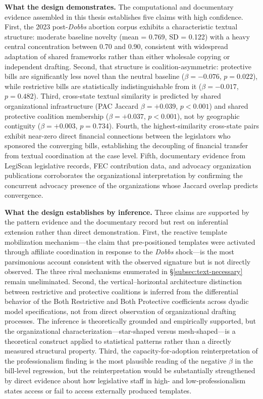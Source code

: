 \textbf{What the design demonstrates.} The computational and documentary evidence assembled in this thesis establishes five claims with high confidence. First, the 2023 post-\emph{Dobbs} abortion corpus exhibits a characteristic textual structure: moderate baseline novelty (mean = 0.769, SD = 0.122) with a heavy central concentration between 0.70 and 0.90, consistent with widespread adaptation of shared frameworks rather than either wholesale copying or independent drafting. Second, that structure is coalition-asymmetric: protective bills are significantly less novel than the neutral baseline ($\beta = -0.076$, $p = 0.022$), while restrictive bills are statistically indistinguishable from it ($\beta = -0.017$, $p = 0.482$). Third, cross-state textual similarity is predicted by shared organizational infrastructure (PAC Jaccard $\beta = +0.039$, $p < 0.001$) and shared protective coalition membership ($\beta = +0.037$, $p < 0.001$), not by geographic contiguity ($\beta = +0.003$, $p = 0.734$). Fourth, the highest-similarity cross-state pairs exhibit near-zero direct financial connections between the legislators who sponsored the converging bills, establishing the decoupling of financial transfer from textual coordination at the case level. Fifth, documentary evidence from LegiScan legislative records, FEC contribution data, and advocacy organization publications corroborates the organizational interpretation by confirming the concurrent advocacy presence of the organizations whose Jaccard overlap predicts convergence.

\textbf{What the design establishes by inference.} Three claims are supported by the pattern evidence and the documentary record but rest on inferential extension rather than direct demonstration. First, the reactive template mobilization mechanism---the claim that pre-positioned templates were activated through affiliate coordination in response to the \emph{Dobbs} shock---is the most parsimonious account consistent with the observed signature but is not directly observed. The three rival mechanisms enumerated in \S\ref{subsec:text-necessary} remain uneliminated. Second, the vertical--horizontal architecture distinction between restrictive and protective coalitions is inferred from the differential behavior of the Both Restrictive and Both Protective coefficients across dyadic model specifications, not from direct observation of organizational drafting processes. The inference is theoretically grounded and empirically supported, but the organizational characterization---star-shaped versus mesh-shaped---is a theoretical construct applied to statistical patterns rather than a directly measured structural property. Third, the capacity-for-adoption reinterpretation of the professionalism finding is the most plausible reading of the negative $\beta$ in the bill-level regression, but the reinterpretation would be substantially strengthened by direct evidence about how legislative staff in high- and low-professionalism states access or fail to access externally produced templates.

